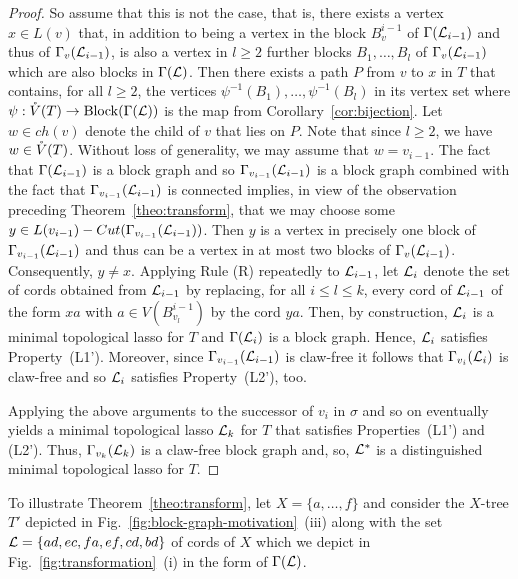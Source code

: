 \begin{proof}
  So assume that this is not the case, that is, there exists a vertex $x\in
  L(v)$ that, in addition to being a vertex in the block $B_v^{i-1}$ of
  $\Gamma({\mathcal L}_{i-1})$ and thus of $\Gamma_v({\mathcal L}_{i-1})$, is also a vertex in
  $l\geq 2$ further blocks $B_1,\ldots, B_l$ of $\Gamma_v({\mathcal L}_{i-1})$ which
  are also blocks in $\Gamma({\mathcal L})$. Then there exists a path $P$ from $v$ to
  $x$ in $T$ that contains, for all $l\geq 2$, the vertices
  $\psi^{-1}(B_1),\ldots, \psi^{-1}(B_l)$ in its vertex set where
  $\psi:\mathring{V}(T)\to \operatorname*{Block}(\Gamma({\mathcal L}))$ is the map from
  Corollary~\ref{cor:bijection}. Let $w\in ch(v)$ denote the child of $v$ that
  lies on $P$. Note that since $l\geq 2$, we have $w\in \mathring{V}(T)$. Without loss
  of generality, we may assume that $w=v_{i-1}$.  The fact that
  $\Gamma({\mathcal L}_{i-1})$ is a block graph and so $\Gamma_{v_{i-1}}({\mathcal L}_{i-1})$ is
  a block graph combined with the fact that $\Gamma_{v_{i-1}}({\mathcal L}_{i-1})$ is
  connected implies, in view of the observation preceding
  Theorem~\ref{theo:transform}, that we may choose some $y\in
  L(v_{i-1})-Cut(\Gamma_{v_{i-1}}({\mathcal L}_{i-1}))$. Then $y$ is a vertex in
  precisely one block of $\Gamma_{v_{i-1}}({\mathcal L}_{i-1})$ and thus can be a
  vertex in at most two blocks of $\Gamma_v({\mathcal L}_{i-1})$.  Consequently,
  $y\not=x$.  Applying Rule (R) repeatedly to ${\mathcal L}_{i-1}$, let ${\mathcal L}_i$ denote
  the set of cords obtained from ${\mathcal L}_{i-1}$ by replacing, for all $i\leq
  l\leq k$, every cord of ${\mathcal L}_{i-1}$ of the form $xa$ with $a\in
  V(B_{v_l}^{i-1})$ by the cord $ya$. Then, by construction, ${\mathcal L}_i$ is a
  minimal topological lasso for $T$ and $\Gamma({\mathcal L}_i)$ is a block
  graph. Hence, ${\mathcal L}_i$ satisfies Property~(L1'). Moreover, since
  $\Gamma_{v_{i-1}}({\mathcal L}_{i-1})$ is claw-free it follows that
  $\Gamma_{v_i}({\mathcal L}_i)$ is claw-free and so ${\mathcal L}_i$ satisfies Property~(L2'),
  too.

  Applying the above arguments to the successor of $v_i$ in $\sigma$ and so on
  eventually yields a minimal topological lasso ${\mathcal L}_k$ for $T$ that satisfies
  Properties~(L1') and (L2'). Thus, $\Gamma_{v_k}({\mathcal L}_k) $ is a claw-free
  block graph and, so, ${\mathcal L}^*$ is a distinguished minimal topological lasso
  for $T$.
\end{proof}

To illustrate Theorem~\ref{theo:transform}, let $X=\{a,\ldots, f\}$ and
consider the $X$-tree $T'$ depicted in
Fig.~\ref{fig:block-graph-motivation}~(iii) along with the set
${\mathcal L}=\{ad,ec,fa,ef,cd,bd\}$ of cords of $X$ which we depict in
Fig.~\ref{fig:transformation}~(i) in the form of $\Gamma({\mathcal L})$.


